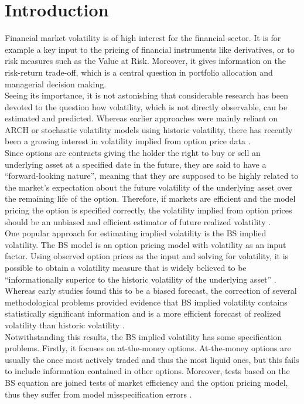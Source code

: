 
\section{Introduction}\label{sec:1Intro}
Financial market volatility is of high interest for the financial sector. It is for example a key input to the pricing of financial instruments like derivatives, or to risk measures such as the Value at Risk. Moreover, it gives information on the risk-return trade-off, which is a central question in portfolio allocation and managerial decision making. \\
Seeing its importance, it is not astonishing that considerable research has been devoted to the question how volatility, which is not directly observable, can be estimated and predicted. Whereas earlier approaches were mainly reliant on ARCH or stochastic volatility models using historic volatility, there has recently been a growing interest in volatility implied from option price data \parencite{bakanova2010}.\\
Since options are contracts giving the holder the right to buy or sell an underlying asset at a specified date in the future, they are said to have a ``forward-looking nature'', meaning that they are supposed to be highly related to the market's expectation about the future volatility of the underlying asset over the remaining life of the option. Therefore, if markets are efficient and the model pricing the option is specified correctly, the volatility implied from option prices should be an unbiased and efficient estimator of future realized volatility \parencite{bakanova2010}.\\
One popular approach for estimating implied volatility is the \ac{BS} implied volatility. The \ac{BS} model is an option pricing model with volatility as an input factor. Using observed option prices as the input and solving for volatility, it is possible to obtain a volatility measure that is widely believed to be ``informationally superior to the historic volatility of the underlying asset'' \parencite[p. 1305]{jiang2003}. Whereas early studies found this to be a biased forecast, the correction of several methodological problems provided evidence that \ac{BS} implied volatility contains statistically significant information and is a more efficient forecast of realized volatility than historic volatility \parencite{jiang2003}.\\
Notwithstanding this results, the \ac{BS} implied volatility has some specification problems. Firstly, it focuses on at-the-money options. At-the-money options are usually the once most actively traded and thus the most liquid ones, but this fails to include information contained in other options. Moreover, tests based on the \ac{BS} equation are joined tests of market efficiency and the option pricing model, thus they suffer from model misspecification errors \parencite{jiang2003}. \\
